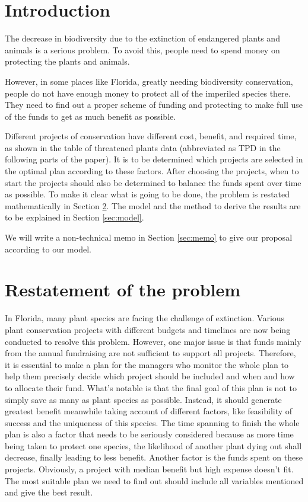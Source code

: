 \documentclass{article}
\begin{document}
\newpage
\section{Introduction}
\label{sec:intro}

The decrease in biodiversity due to the extinction of endangered plants and animals is a serious problem.
To avoid this, people need to spend money on protecting the plants and animals.

However, in some places like Florida, greatly needing biodiversity conservation,
people do not have enough money to protect all of the imperiled species there.
They need to find out a proper scheme of funding and protecting to make full use of the funds to get as much benefit as possible.

Different projects of conservation have different cost, benefit, and required time,
as shown in the table of threatened plants data (abbreviated as TPD in the following parts of the paper).
It is to be determined which projects are selected in the optimal plan according to these factors.
After choosing the projects, when to start the projects should also be determined to balance the funds spent over time as possible.
To make it clear what is going to be done, the problem is restated mathematically in Section \ref{sec:restatement}.
The model and the method to derive the results are to be explained in Section \ref{sec:model}.

We will write a non-technical memo in Section \ref{sec:memo} to give our proposal according to our model.


\section{Restatement of the problem}
\label{sec:restatement}

In Florida, many plant species are facing the challenge of extinction.
Various plant conservation projects with different budgets and timelines are now being conducted to resolve this problem.
However, one major issue is that funds mainly from the annual fundraising are not sufficient to support all projects.
Therefore, it is essential to make a plan for the managers who monitor the whole plan to help them precisely decide which project should be included and when and how to allocate their fund.
What's notable is that the final goal of this plan is not to simply save as many as plant species as possible.
Instead, it should generate greatest benefit meanwhile taking account of different factors, like feasibility of success and the uniqueness of this species.
The time spanning to finish the whole plan is also a factor that needs to be seriously considered because as more time being taken to protect one species, the likelihood of another plant dying out shall decrease, finally leading to less benefit.
Another factor is the funds spent on these projects.
Obviously, a project with median benefit but high expense doesn't fit.
The most suitable plan we need to find out should include all variables mentioned and give the best result.
\end{document}
